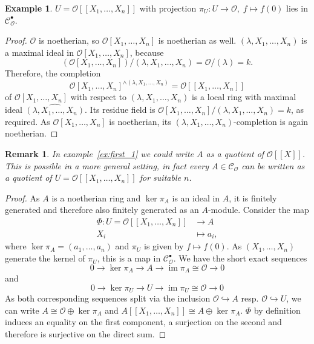 \documentclass{article}
\theoremstyle{plain}%
\newtheorem{remark}{Remark}[section]
\theoremstyle{definition}
\newtheorem{example}{Example}[section]
\theoremstyle{remark}
\newcommand{\cob}{\mathcal{C}_\mathcal{O}^\bullet}
\newcommand{\co}{\mathcal{C}_\mathcal{O}}
\newcommand{\im}{\operatorname{im}}
\begin{document}

    \begin{example}\label{ex:last_1}
        \(U = \mathcal{O}[[X_1, \dots, X_n]]\) with projection \(\pi_U\colon U \to \mathcal{O},\; f \mapsto f(0)\) lies in \(\cob\).
        \begin{proof}
            \(\mathcal{O}\) is noetherian, so \(\mathcal{O}[X_1, \dots, X_{n}]\) is noetherian as well.
            \((\lambda, X_1, \dots, X_n)\) is a maximal ideal in \(\mathcal{O}[X_1, \dots, X_n]\), because
            \[\left(\mathcal{O}[X_1, \dots, X_n]\right)/(\lambda, X_1, \dots, X_n) = \mathcal{O}/(\lambda) = k.\]
            Therefore, the completion \[\mathcal{O}[X_1, \dots, X_n]^{\wedge(\lambda, X_1, \dots, X_n)} = \mathcal{O}[[X_1, \dots, X_n]]\]
            of \(\mathcal{O}[X_1, \dots, X_n]\) with respect to \((\lambda, X_1, \dots, X_n)\) is a local ring with maximal ideal
            \(\widehat{(\lambda, X_1, \dots, X_n)}\).
            Its residue field is \(\mathcal{O}[X_1, \dots, X_n]/(\lambda, X_1, \dots, X_n) = k\), as required.
            As \(\mathcal{O}[X_1, \dots, X_n]\) is noetherian, its \((\lambda, X_1, \dots, X_n)\)-completion is again noetherian.
        \end{proof}
    \end{example}

    \begin{remark}
        In example~\ref{ex:first_1} we could write \(A\) as a quotient of \(\mathcal{O}[[X]]\). 
        This is possible in a more general setting, in fact every \(A \in \co\) can be written as a quotient of
        \(U = \mathcal{O}[[X_1, \dots, X_n]]\) for suitable \(n\).
    \end{remark}
    \begin{proof}
        As \(A\) is a noetherian ring and \(\ker \pi_A\) is an ideal in \(A\), it is finitely generated and therefore also finitely generated
        as an \(A\)-module. Consider the map
        \begin{align*}
            \Phi\colon U = \mathcal{O}[[X_1, \dots, X_n]] &\to A\\
            X_i &\mapsto a_i,
        \end{align*}
        where \(\ker \pi_A = (a_1, \dots, a_n)\) and \(\pi_U\) is given by \(f \mapsto f(0)\). 
        As \((X_1, \dots, X_n)\) generate the kernel of \(\pi_U\), this is a map in \(\cob\).
        We have the short exact sequences
        \[
         0 \to \ker \pi_A \to A \to \im \pi_A \cong \mathcal{O} \to 0
        \]
        and
        \[
            0 \to \ker \pi_U \to U \to \im \pi_U \cong \mathcal{O} \to 0
        \]
        As both corresponding sequences split via the inclusion \(\mathcal{O} \hookrightarrow A\) resp. \(\mathcal{O} \hookrightarrow U\), 
        we can write \(A \cong \mathcal{O} \oplus \ker \pi_A\) and \(A[[X_1, \dots, X_n]] \cong A \oplus \ker \pi_A\).
        \(\Phi\) by definition induces an equality on the first component, a surjection on the second and therefore is surjective on the
        direct sum.
    \end{proof}
\end{document}
